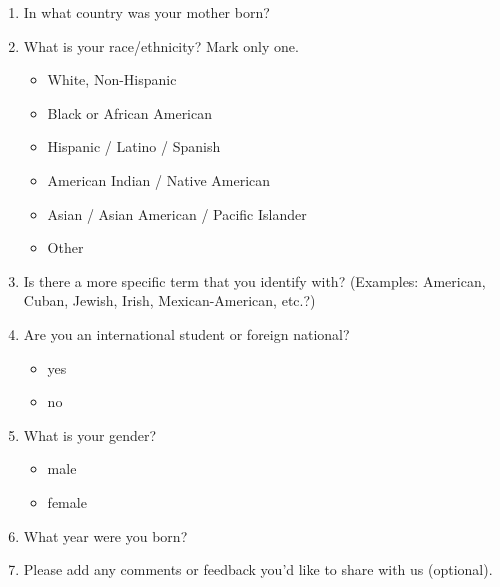 \documentclass[letterpaper,10pt]{article}
\begin{document}
\begin{enumerate}[resume]
\item In what country was your mother born? \underline{\hspace{2.5in}}\\[0.05in]

\item What is your race/ethnicity? Mark only one.
\vspace{-0.1in}\begin{multicols}{2}
\begin{itemize}
	\item White, Non-Hispanic
	\item Black or African American
	\item Hispanic / Latino / Spanish
	\item American Indian / Native American
	\item Asian / Asian American / Pacific Islander
	\item Other
\end{itemize}
\end{multicols}

\item Is there a more specific term that you identify with? (Examples: American, Cuban, Jewish, Irish, Mexican-American, etc.?)\\

\underline{\hspace{3in}}

\item Are you an international student or foreign national?
\vspace{-0.1in}\begin{multicols}{2}
\begin{itemize}
	\item yes
	\item no
\end{itemize}
\end{multicols}

\item What is your gender?
\vspace{-0.1in}\begin{multicols}{2}
\begin{itemize}
	\item male
	\item female
\end{itemize}
\end{multicols}

\item What year were you born? \underline{\hspace{2.5in}}\\[0.05in]


\item Please add any comments or feedback you'd like to share with us (optional).\\
\fbox{\parbox{6in}{\textcolor{white}{.}\\[1.5in]}}

\end{enumerate}
\end{document}
